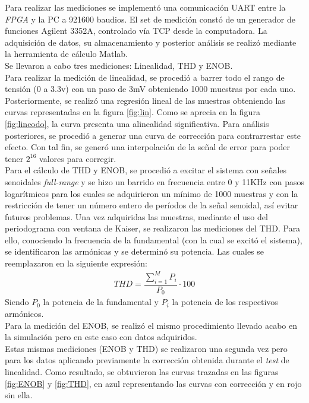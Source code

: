 \documentclass[a4paper,conference]{IEEEtran}
\begin{document}
Para realizar las mediciones se implementó una comunicaci\'on UART entre la \textit{FPGA} y la PC a 921600 baudios. El set de medici\'on const\'o de un generador de funciones Agilent 3352A\cite{AgilentWG}, controlado v\'ia TCP desde la computadora. La adquisición de datos, su almacenamiento y posterior análisis se realizó mediante la herramienta de cálculo Matlab\textregistered. \\Se llevaron a cabo tres mediciones: Linealidad, THD y ENOB.\\
Para realizar la medición de linealidad, se procedió a barrer todo el rango de tensión (0 a 3.3v) con un paso de 3mV obteniendo 1000 muestras por cada uno. Posteriormente, se realizó una regresión lineal de las muestras obteniendo las curvas representadas en la figura \ref{fig:lin}. Como se aprecia en la figura \ref{fig:lincodo}, la curva presenta una alinealidad significativa. Para análisis posteriores, se procedió a generar una curva de corrección para contrarrestar este efecto. Con tal fin, se generó una interpolación de la señal de error para poder tener $2^{16}$ valores para corregir.\\
Para el cálculo de THD y ENOB, se procedió a excitar el sistema con señales senoidales \textit{full-range} y se hizo un barrido en frecuencia entre 0 y 11KHz con pasos logarítmicos para los cuales se adquirieron un mínimo de 1000 muestras y con la restricción de tener un número entero de períodos de la señal senoidal, así evitar futuros problemas.
Una vez adquiridas las muestras, mediante el uso del periodograma con ventana de Kaiser, se realizaron las mediciones del THD. Para ello, conociendo la frecuencia de la fundamental (con la cual se excitó el sistema), se identificaron las armónicas y se determinó su potencia. Las cuales se reemplazaron en la siguiente expresión:
\begin{align}
THD = \dfrac{\sum_{i=1}^{M}P_i }{P_0}\cdot100
\end{align}
Siendo $P_0$ la potencia de la fundamental y $P_i$ la potencia de los respectivos armónicos.\\
Para la medición del ENOB, se realizó el mismo procedimiento llevado acabo en la simulación pero en este caso con datos adquiridos.\\
Estas mismas mediciones (ENOB y THD) se realizaron una segunda vez pero para los datos aplicando previamente la corrección obtenida durante el \textit{test} de linealidad. Como resultado, se obtuvieron las curvas trazadas en las figuras \ref{fig:ENOB} y \ref{fig:THD}, en azul representando las curvas con corrección y en rojo sin ella.
\end{document}

